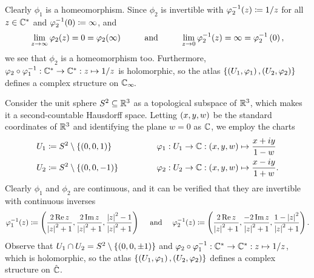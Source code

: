 \documentclass[../Moduli_Spaces_of_Riemann_Surfaces.tex]{subfiles}
\begin{document}
\begin{example}
\begin{equation*}
        \end{equation*}
        Clearly $\phi_1$ is a homeomorphism. Since $\phi_2$ is invertible with $\varphi_2^{-1}\!\left(z\right)\coloneqq1/z$ for all $z\in\mathbb{C}^\ast$ and $\varphi_2^{-1}\!\left(0\right)\coloneqq\infty$, and
        \begin{equation*}
            \lim\limits_{z\to\infty}\phi_2\!\l(z\r)=0=\phi_2\!\l(\infty\r)\ \ \ \ \ \ \ \ \textrm{and}\ \ \ \ \ \ \ \ \lim\limits_{z\to0}\phi_2^{-1}\!\l(z\r)=\infty=\phi_2^{-1}\l(0\r),
        \end{equation*}
        we see that $\phi_2$ is a homeomorphism too. Furthermore, $\varphi_2\circ\varphi_1^{-1}:\mathbb{C}^\ast\to\mathbb{C}^\ast:z\mapsto1/z$ is holomorphic, so the atlas $\left\{\left(U_1,\varphi_1\right),\left(U_2,\varphi_2\right)\right\}$ defines a complex structure on $\mathbb{C}_\infty\!$.\exqed
    \end{example}
    \begin{example}\label{RS:exa:stereographic_projection}
        Consider the unit sphere $S^2\subseteq\mathbb{R}^3$ as a topological subspace of $\mathbb{R}^3$, which makes it a second-countable Hausdorff space. Letting $\left(x,y,w\right)$ be the standard coordinates of $\mathbb{R}^3$ and identifying the plane $w=0$ as $\mathbb{C}$, we employ the charts
        \begin{equation*}
            \begin{alignedat}{2}
                U_1&\coloneqq S^2\comp\l\{\l(0,0,1\r)\r\}\ \ \ \ \ \ \ \ \ \ \ \ \ \ \ \ &&\phi_1:U_1\to\C:\tpl{x,y,w}\mapsto\frac{x+iy}{1-w} \\
                U_2&\coloneqq S^2\comp\l\{\l(0,0,-1\r)\r\}&&\phi_2:U_2\to\C:\tpl{x,y,w}\mapsto\frac{x-iy}{1+w}.
            \end{alignedat}
        \end{equation*}
        Clearly $\phi_1$ and $\phi_2$ are continuous, and it can be verified that they are invertible with continuous inverses
        \begin{equation*}
            \phi_1^{-1}\!\l(z\r)\coloneqq\tpl{\frac{2\Re z}{\l|z\r|^2+1},\frac{2\Im z}{\l|z\r|^2+1},\frac{\l|z\r|^2-1}{\l|z\r|^2+1}}\ \ \ \ \textrm{and}\ \ \ \ \phi_2^{-1}\!\l(z\r)\coloneqq\tpl{\frac{2\Re z}{\l|z\r|^2+1},\frac{-2\Im z}{\l|z\r|^2+1},\frac{1-\l|z\r|^2}{\l|z\r|^2+1}}.
        \end{equation*}
        Observe that $U_1\cap U_2=S^2\setminus\left\{\left(0,0,\pm1\right)\right\}$ and $\varphi_2\circ\varphi_1^{-1}:\mathbb{C}^\ast\to\mathbb{C}^\ast:z\mapsto1/z$, which is holomorphic, so the atlas $\left\{\left(U_1,\varphi_1\right),\left(U_2,\varphi_2\right)\right\}$ defines a complex structure on $\hat{\mathbb{C}}$.\exqed
    \end{example}
\end{document}
